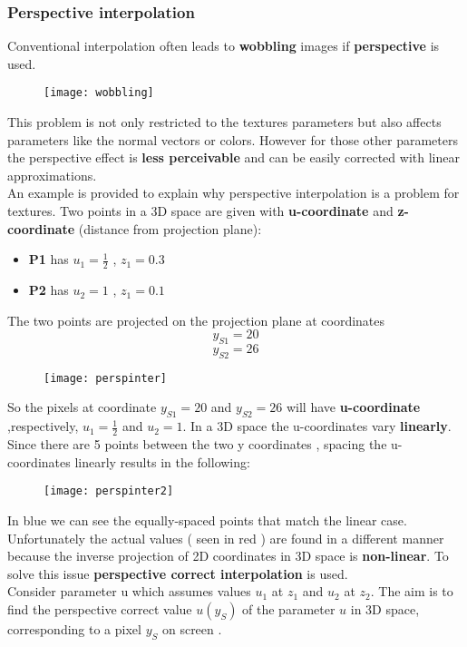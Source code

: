 \subsubsection{Perspective interpolation}
Conventional interpolation often leads to \textbf{wobbling} images if \textbf{perspective} is used.
\begin{figure}[H]
  \centering
  \texttt{[image: wobbling]}
\end{figure}
This problem is not only restricted to the textures parameters but also affects parameters like the normal vectors or colors. However for those other parameters the perspective effect is \textbf{less perceivable} and can be easily corrected with linear approximations.\\
An example is provided to explain why perspective interpolation is a problem for textures. Two points in a 3D space are given with \textbf{u-coordinate} and \textbf{z-coordinate} (distance from projection plane):
\begin{itemize}
\item \textbf{P1} has $u_1 = \frac{1}{2}$ , $z_1 = 0.3$
\item \textbf{P2} has $u_2 = 1$ , $z_1 = 0.1$ 
\end{itemize}
The two points are projected on the projection plane at coordinates
$$ y_{S1}= 20$$
$$ y_{S2}= 26$$
\begin{figure}[H]
  \centering
  \texttt{[image: perspinter]}
\end{figure}
So the pixels at coordinate $ y_{S1}= 20$ and $ y_{S2}= 26$ will have \textbf{u-coordinate} ,respectively, $u_1 = \frac{1}{2}$ and $u_2 = 1$. In a 3D space the u-coordinates vary \textbf{linearly}. Since there are 5 points between the two y coordinates , spacing the u-coordinates linearly results in the following:
\begin{figure}[H]
  \centering
  \texttt{[image: perspinter2]}
\end{figure}
In blue we can see the equally-spaced points that match the linear case. Unfortunately the actual values ( seen in red ) are found in a different manner because the inverse projection of 2D coordinates in 3D space is \textbf{non-linear}.
To solve this issue \textbf{perspective correct interpolation} is used.\\
Consider parameter u which assumes values $u_1$ at $z_1$ and $u_2$ at $z_2$. The aim is to find the perspective correct value $u(y_S)$ of the parameter $u$ in 3D space, corresponding to a pixel $y_S$ on screen .
